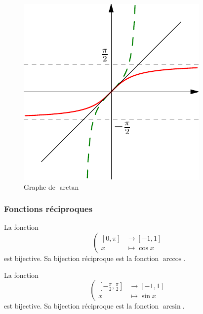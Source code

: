 \begin{figure}[h!t]
 \centering
 \includegraphics{./C2004_3.pdf}
 \caption{Graphe de $\arctan$}
 \label{fig:C2004_3}
\end{figure}

\subsubsection{Fonctions réciproques}
\begin{defi}
 La fonction
\begin{displaymath}
 \left(
\begin{aligned}
 \left[ 0,\pi\right]   &\rightarrow [-1,1]\\x &\mapsto \cos x
\end{aligned}
\right. 
\end{displaymath}
est bijective. Sa bijection réciproque est la fonction $\arccos$.
\end{defi}

\begin{defi}
 La fonction
\begin{displaymath}
 \left(
\begin{aligned}
 \left[ -\frac{\pi}{2},\frac{\pi}{2}\right]   &\rightarrow [-1,1]\\x &\mapsto \sin x
\end{aligned}
\right. 
\end{displaymath}
est bijective. Sa bijection réciproque est la fonction $\arcsin$.
\end{defi}

